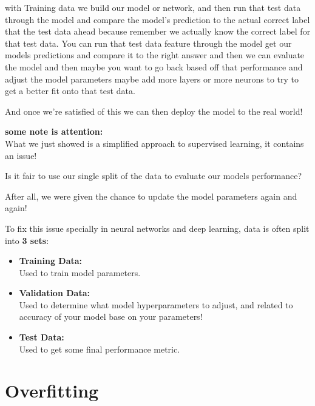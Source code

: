 \documentclass[12pt]{article}
\begin{document}
with Training data we build our model or network, and then run that test data through the model and compare the model's prediction to the actual correct label that the test data ahead because remember we actually know the correct label for that test data. 
You can run that test data feature through the model get our models predictions and compare it to the right answer and then we can evaluate the model and then maybe you want to go back based off that performance and adjust the model parameters maybe add more layers or more neurons to try to get a better fit onto that test data.

And once we're satisfied of this we can then deploy the model to the real world!


\textbf{some note is attention: }\\

What we just showed is a simplified approach to supervised learning, it contains an issue!

Is it fair to use our single split of the data to evaluate our models performance?

After all, we were given the chance to update the model parameters again and again!

\large To fix this issue specially in neural networks and deep learning, data is often split into \textbf{3 sets}:
\begin{itemize}
	\item
	\textbf{Training Data:}\\
	Used to train model parameters.
	
	\item 
	\textbf{Validation Data:}\\
	Used to determine what model hyperparameters to adjust, and related to accuracy of your model base on your parameters!
	
	\item
	\textbf{Test Data:}\\
	Used to get some final performance metric.
	
\end{itemize}

\section{Overfitting}
\end{document}
